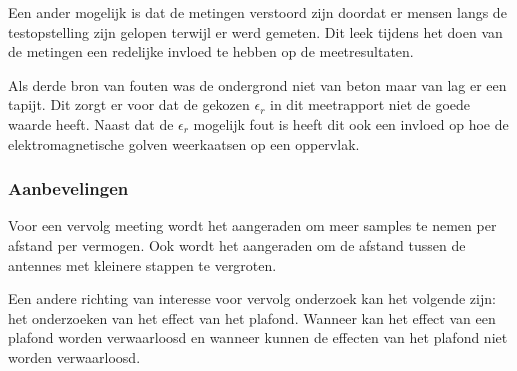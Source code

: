 Een ander mogelijk is dat de metingen verstoord zijn doordat er mensen langs de testopstelling zijn gelopen terwijl er werd gemeten. Dit leek tijdens het doen van de metingen een redelijke invloed te hebben op de meetresultaten.

Als derde bron van fouten was de ondergrond niet van beton maar van lag er een tapijt. Dit zorgt er voor dat de gekozen $\epsilon_r$ in dit meetrapport niet de goede waarde heeft. Naast dat de $\epsilon_r$ mogelijk fout is heeft dit ook een invloed op hoe de elektromagnetische golven weerkaatsen op een oppervlak. 

\subsubsection{Aanbevelingen}
Voor een vervolg meeting wordt het aangeraden om meer samples te nemen per afstand per vermogen. Ook wordt het aangeraden om de afstand tussen de antennes met kleinere stappen te vergroten.

Een andere richting van interesse voor vervolg onderzoek kan het volgende zijn: het onderzoeken van het effect van het plafond. Wanneer kan het effect van een plafond worden verwaarloosd en wanneer kunnen de effecten van het plafond niet worden verwaarloosd.